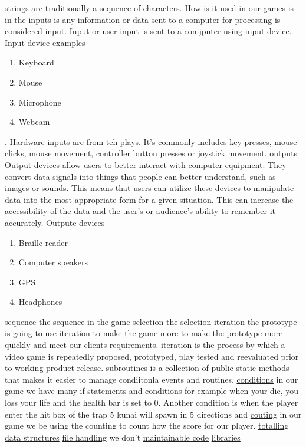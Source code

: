 \documentclass{article}
\begin{document}
\underline{strings} are traditionally a sequence of characters. How is it used in our games is in the 
\underline{inputs} is any information or data sent to a computer for processing is considered input. Input or user input is sent to a comjputer using input device. 
Input device examples
\begin{enumerate}
	\item Keyboard
	\item Mouse
	\item Microphone
	\item Webcam
\end{enumerate}
. Hardware inputs are from teh plays. It's commonly includes key presses, mouse clicks, mouse movement, controller button presses or joystick movement.
\underline{outputs}
Output devices allow users to better interact with computer equipment. They convert data signals into things that people can better understand, such as images or sounds. This means that users can utilize these devices to manipulate data into the most appropriate form for a given situation. This can increase the accessibility of the data and the user's or audience's ability to remember it accurately.
Outpute devices
\begin{enumerate}
	\item Braille reader
	\item Computer speakers
	\item GPS
	\item Headphones
\end{enumerate}
\underline{sequence} the sequence in the game 
\underline{selection} the selection 
\underline{iteration} the prototype is going to use iteration to make the game more to make the prototype more quickly and meet our clients requirements. iteration is the process by which a video game is repeatedly proposed, prototyped, play tested and reevaluated prior to working product release.
\underline{subroutines} is a collection of public static methods that makes it easier to manage condiitonla events and routines. 
\underline{conditions} in our game we have many if statements and conditions for example when your die, you loss your life and the health bar is set to 0. Another condition is when the player enter the hit box of the trap 5 kunai will spawn in 5 directions and 
\underline{couting} in our game we be using the counting to count how the score for our player.
\underline{totalling}
\underline{data structures}
\underline{file handling} we don't 
\underline{maintainable code}
\underline{libraries} 
\end{document}
